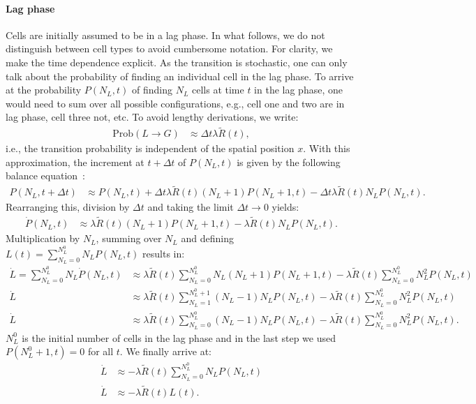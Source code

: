 \documentclass[10pt,1p,authoryear]{elsarticle}
\numberwithin{equation}{section}
\begin{document}
\paragraph{Lag phase}
Cells are initially assumed to be in a lag phase. In what follows, we do not distinguish between cell types to avoid cumbersome notation. For clarity, we make the time dependence explicit. As the transition is stochastic, one can only talk about the probability of finding an individual cell in the lag phase. To arrive at the probability $P(N_L,t)$ of finding $N_L$ cells at time $t$ in the lag phase, one would need to
sum over all possible configurations, e.g., cell one and two are in lag phase, cell three not, etc. To avoid lengthy derivations, we write:
\begin{align}
    \text{Prob}(L\to G) &\approx \Delta t \lambda \tilde{R}(t),
\end{align}
i.e., the transition probability is independent of the spatial position $x$. With this approximation, the increment at $t+\Delta t$ of $P(N_L,t)$ is given by the following balance equation~\citep{baranyiComparisonStochastic1998, vankampenStochasticProcesses2011}:
 \begin{align}
    P(N_L,t+\Delta t) &\approx P(N_L,t) +\Delta t \lambda \tilde{R}(t)(N_L+1)P(N_L+1,t)-\Delta t \lambda \tilde{R}(t)N_LP(N_L,t).
\end{align}
Rearranging this, division by $\Delta t$ and taking the limit $\Delta t\to 0$ yields:
 \begin{align}
    \dot{P}(N_L,t) &\approx  \lambda \tilde{R}(t)(N_L+1)P(N_L+1,t)- \lambda \tilde{R}(t)N_L P(N_L,t).
\end{align}
Multiplication by $N_L$, summing over $N_L$ and defining $L(t)=\sum_{N_L=0}^{N_L^0}N_L P(N_L,t) $ results in:
\begin{align}
    \dot{L}=\sum_{N_L=0}^{N_L^0}N_L\dot{P}(N_L,t) &\approx \lambda \tilde{R}(t)\sum_{N_L=0}^{N_L^0}N_L(N_L+1)P(N_L+1,t)- \lambda \tilde{R}(t)\sum_{N_L=0}^{N_L^0}N_L^2P(N_L,t)\\
    \dot{L}&\approx\lambda \tilde{R}(t)\sum_{N_L=1}^{N_L^0+1}(N_L-1)N_LP(N_L,t)- \lambda \tilde{R}(t)\sum_{N_L=0}^{N_L^0}N_L^2P(N_L,t)\\
     \dot{L}&\approx\lambda \tilde{R}(t)\sum_{N_L=0}^{N_L^0}(N_L-1)N_LP(N_L,t)- \lambda \tilde{R}(t)\sum_{N_L=0}^{N_L^0}N_L^2P(N_L,t).
\end{align}
$N_L^0$ is the initial number of cells in the lag phase and in the last step we used $P(N_L^0+1,t)=0$ for all $t$. We finally arrive at:
\begin{align}
     \dot{L}&\approx-\lambda \tilde{R}(t)\sum_{N_L=0}^{N_L^0}N_LP(N_L,t)\\
     \dot{L}&\approx-\lambda \tilde{R}(t)L(t).
\end{align}
%
%
\end{document}
